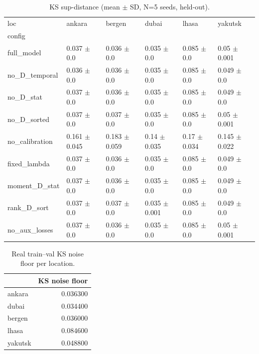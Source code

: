 \begin{table}
\caption{KS sup-distance (mean $\pm$ SD, N=5 seeds, held-out).}
\label{tab:ks_stat_v2}
\begin{tabular}{llllll}
\toprule
loc & ankara & bergen & dubai & lhasa & yakutsk \\
config &  &  &  &  &  \\
\midrule
full\_model & 0.037 $\pm$ 0.0 & 0.036 $\pm$ 0.0 & 0.035 $\pm$ 0.0 & 0.085 $\pm$ 0.0 & 0.05 $\pm$ 0.001 \\
no\_D\_temporal & 0.036 $\pm$ 0.0 & 0.036 $\pm$ 0.0 & 0.035 $\pm$ 0.0 & 0.085 $\pm$ 0.0 & 0.049 $\pm$ 0.0 \\
no\_D\_stat & 0.037 $\pm$ 0.0 & 0.036 $\pm$ 0.0 & 0.035 $\pm$ 0.0 & 0.085 $\pm$ 0.0 & 0.049 $\pm$ 0.0 \\
no\_D\_sorted & 0.037 $\pm$ 0.0 & 0.037 $\pm$ 0.0 & 0.035 $\pm$ 0.0 & 0.085 $\pm$ 0.0 & 0.05 $\pm$ 0.001 \\
no\_calibration & 0.161 $\pm$ 0.045 & 0.183 $\pm$ 0.059 & 0.14 $\pm$ 0.035 & 0.17 $\pm$ 0.034 & 0.145 $\pm$ 0.022 \\
fixed\_lambda & 0.037 $\pm$ 0.0 & 0.036 $\pm$ 0.0 & 0.035 $\pm$ 0.0 & 0.085 $\pm$ 0.0 & 0.049 $\pm$ 0.0 \\
moment\_D\_stat & 0.037 $\pm$ 0.0 & 0.036 $\pm$ 0.0 & 0.035 $\pm$ 0.0 & 0.085 $\pm$ 0.0 & 0.049 $\pm$ 0.0 \\
rank\_D\_sort & 0.037 $\pm$ 0.0 & 0.037 $\pm$ 0.0 & 0.035 $\pm$ 0.001 & 0.085 $\pm$ 0.0 & 0.049 $\pm$ 0.0 \\
no\_aux\_losses & 0.037 $\pm$ 0.0 & 0.036 $\pm$ 0.0 & 0.035 $\pm$ 0.0 & 0.085 $\pm$ 0.0 & 0.05 $\pm$ 0.001 \\
\bottomrule
\end{tabular}
\end{table}


\begin{table}
\caption{Real train--val KS noise floor per location.}
\label{tab:floor}
\begin{tabular}{lr}
\toprule
 & KS noise floor \\
\midrule
ankara & 0.036300 \\
dubai & 0.034400 \\
bergen & 0.036000 \\
lhasa & 0.084600 \\
yakutsk & 0.048800 \\
\bottomrule
\end{tabular}
\end{table}


